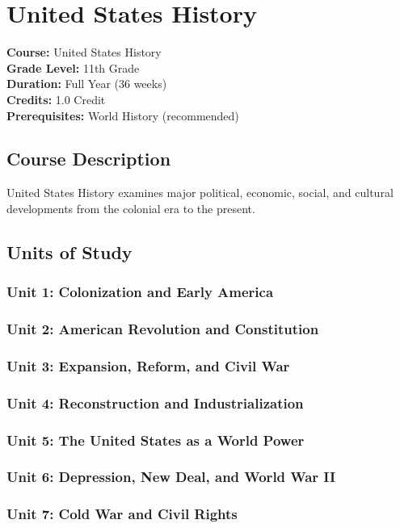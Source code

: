 \documentclass[12pt,oneside]{book}
\begin{document}
\chapter{United States History}

\noindent\textbf{Course:} United States History\\
\textbf{Grade Level:} 11th Grade\\
\textbf{Duration:} Full Year (36 weeks)\\
\textbf{Credits:} 1.0 Credit\\
\textbf{Prerequisites:} World History (recommended)

\section{Course Description}
United States History examines major political, economic, social, and cultural developments from
the colonial era to the present.

\section{Units of Study}
\subsection*{Unit 1: Colonization and Early America}
\subsection*{Unit 2: American Revolution and Constitution}
\subsection*{Unit 3: Expansion, Reform, and Civil War}
\subsection*{Unit 4: Reconstruction and Industrialization}
\subsection*{Unit 5: The United States as a World Power}
\subsection*{Unit 6: Depression, New Deal, and World War II}
\subsection*{Unit 7: Cold War and Civil Rights}
\end{document}
